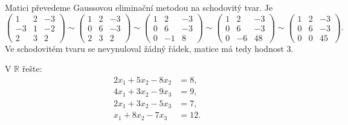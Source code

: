 \begin{reseni}
Matici převedeme Gaussovou eliminační metodou na schodovitý tvar. Je
$$\begin{pmatrix}
    1 & 2 & -3 \\
    -3 & 1 & -2 \\
    2 & 3 & 2
\end{pmatrix}\sim
\begin{pmatrix}
    1 & 2 & -3 \\
    0 & 6 & -3 \\
    2 & 3 & 2
\end{pmatrix}\sim
\begin{pmatrix}
    1 & 2 & -3 \\
    0 & 6 & -3 \\
    0 & -1 & 8
\end{pmatrix}\sim
\begin{pmatrix}
    1 & 2 & -3 \\
    0 & 6 & -3 \\
    0 & -6 & 48
\end{pmatrix}\sim
\begin{pmatrix}
    1 & 2 & -3 \\
    0 & 6 & -3 \\
    0 & 0 & 45
\end{pmatrix}.$$
Ve schodovitém tvaru se nevynuloval žádný řádek, matice má tedy hodnost $3$.
\end{reseni}

\begin{priklad}
V $\mathbb R$ řešte:
\begin{align*}
    2x_1+5x_2-8x_2 & =8, \\
    4x_1 + 3x_2 - 9x_3 & =9,\\
    2x_1 + 3x_2 - 5x_3 & = 7, \\
    x_1 + 8x_2 - 7x_3 & = 12.
\end{align*}
\end{priklad}

